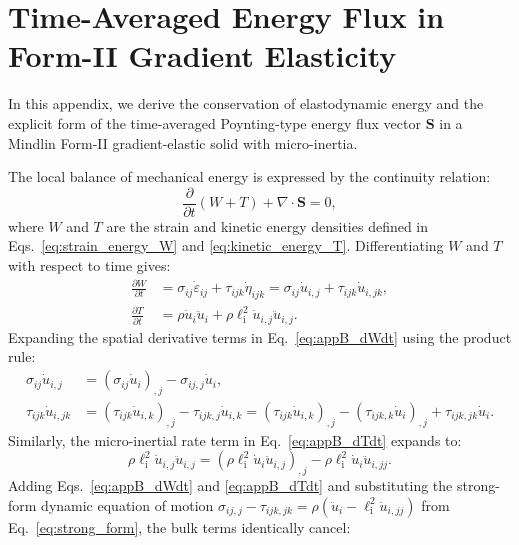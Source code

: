 \section{Time-Averaged Energy Flux in Form-II Gradient Elasticity}
\label{app:energy_flux}

In this appendix, we derive the conservation of elastodynamic energy and the explicit form of the time-averaged Poynting-type energy flux vector $\bm{S}$ in a Mindlin Form-II gradient-elastic solid with micro-inertia.

The local balance of mechanical energy is expressed by the continuity relation:
\begin{equation}
\frac{\partial}{\partial t}(W + T) + \nabla \cdot \bm{S} = 0,
\label{eq:appB_poynting_theorem}
\end{equation}
where $W$ and $T$ are the strain and kinetic energy densities defined in Eqs.~\eqref{eq:strain_energy_W} and \eqref{eq:kinetic_energy_T}. Differentiating $W$ and $T$ with respect to time gives:
\begin{align}
\frac{\partial W}{\partial t} &= \sigma_{ij} \dot{\varepsilon}_{ij} + \tau_{ijk} \dot{\eta}_{ijk} = \sigma_{ij} \dot{u}_{i,j} + \tau_{ijk} \dot{u}_{i,jk}, \label{eq:appB_dWdt} \\
\frac{\partial T}{\partial t} &= \rho \dot{u}_i \ddot{u}_i + \rho \ell_{\mathrm{i}}^2 \dot{u}_{i,j} \ddot{u}_{i,j}. \label{eq:appB_dTdt}
\end{align}
Expanding the spatial derivative terms in Eq.~\eqref{eq:appB_dWdt} using the product rule:
\begin{align}
\sigma_{ij} \dot{u}_{i,j} &= (\sigma_{ij} \dot{u}_i)_{,j} - \sigma_{ij,j} \dot{u}_i, \label{eq:appB_id1} \\
\tau_{ijk} \dot{u}_{i,jk} &= (\tau_{ijk} \dot{u}_{i,k})_{,j} - \tau_{ijk,j} \dot{u}_{i,k} = (\tau_{ijk} \dot{u}_{i,k})_{,j} - (\tau_{ijk,k} \dot{u}_i)_{,j} + \tau_{ijk,jk} \dot{u}_i. \label{eq:appB_id2}
\end{align}
Similarly, the micro-inertial rate term in Eq.~\eqref{eq:appB_dTdt} expands to:
\begin{equation}
\rho \ell_{\mathrm{i}}^2 \dot{u}_{i,j} \ddot{u}_{i,j} = (\rho \ell_{\mathrm{i}}^2 \dot{u}_i \ddot{u}_{i,j})_{,j} - \rho \ell_{\mathrm{i}}^2 \dot{u}_i \ddot{u}_{i,jj}.
\label{eq:appB_id3}
\end{equation}
Adding Eqs.~\eqref{eq:appB_dWdt} and \eqref{eq:appB_dTdt} and substituting the strong-form dynamic equation of motion $\sigma_{ij,j} - \tau_{ijk,jk} = \rho(\ddot{u}_i - \ell_{\mathrm{i}}^2 \ddot{u}_{i,jj})$ from Eq.~\eqref{eq:strong_form}, the bulk terms identically cancel:
